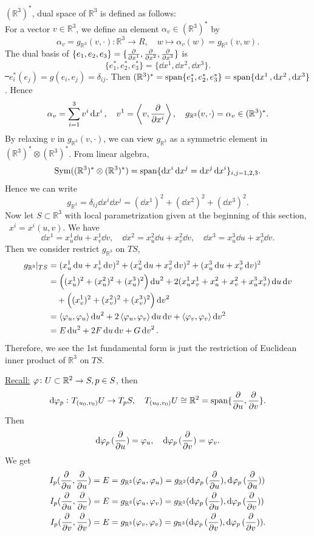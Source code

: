 \((\mathbb{R}^3)^*\), dual space of \(\mathbb{R}^3\) is defined as follows:\\
For a vector \(v\in \mathbb{R}^3\), we define an element \(\alpha_v\in(\mathbb{R}^3)
^*\) by \[
    \alpha_v=g_{\mathbb{R}^3}(v,\cdot)\colon \mathbb{R}^3\to R, \quad 
    w\mapsto \alpha_v(w)=g_{\mathbb{R}^3}(v,w)
.\] The dual basis of \(\{e_1,e_2,e_3\}=\{\pdv{x^1},\pdv{x^2},\pdv{x^3}\}\) is \[
    \{e_1^*,e_2^*,e_3^*\}=\{\dd{x^1},\dd{x^2},\dd{x^3}\}
.\] \st\ \(e_i^*(e_j)=g(e_i,e_j)=\delta_{ij}\). Then \((\mathbb{R}^3)^*=\operatorname{span}
\{e_1^*,e_2^*,e_3^*\}=\operatorname{span}\{\dd{x^1},\dd{x^2},\dd{x^3}\}\). Hence \[
    \alpha_v=\sum_{i=1}^3 v^i \dd{x^i},\quad
    v^1=\left<v,\pdv{x^i}\right> ,\quad
    g_{\mathbb{R}^3}(v,\cdot)=\alpha_v\in (\mathbb{R}^3)^*
.\] By relaxing \(v\) in \(g_{\mathbb{R}^3}(v,\cdot)\), we can view \(g_{\mathbb{R}
^3}\) as a symmetric element in \((\mathbb{R}^3)^*\otimes (\mathbb{R}^3)^*\).
From linear algebra, \[
    \mathrm{Sym}((\mathbb{R}^3)^*\otimes (\mathbb{R}^3)^*)=
    \operatorname{span}\{\dd{x^i}\dd{x^j}=\dd{x^j}\dd{x^i}\}_{i,j=1,2,3}
.\] Hence we can write \[
    g_{\mathbb{R}^3}=\delta_{ij}\dd{x^i}\dd{x^j}=
    (\dd{x^1})^2+(\dd{x^2})^2+(\dd{x^3})^2
.\] Now let \(S\subset \mathbb{R}^3\) with local parametrization given at the
beginning of this section, \ie\ \(x^i=x^i(u,v)\). We have \[
    \dd{x^1}=x_u^1\dd{u}+x_v^1\dd{v},\quad
    \dd{x^2}=x_u^2\dd{u}+x_v^2\dd{v},\quad
    \dd{x^3}=x_u^3\dd{u}+x_v^3\dd{v}
.\] Then we consider restrict \(g_{\mathbb{R}^3}\) on \(TS\),
\begin{align*}
    g_{\mathbb{R}^3}|_{TS}
    &=(x_u^1\dd{u}+x_v^1\dd{v})^2+(x_u^2\dd{u}+x_v^2\dd{v})^2
    +(x_u^3\dd{u}+x_v^3\dd{v})^2 \\
    &=\left((x_u^1)^2+(x_u^2)^2+(x_u^3)^2\right)\dd{u}^2
    +2(x_u^1x_v^1+x_u^2+x_v^2+x_u^3x_v^3)\dd{u}\dd{v} \\
    &\quad+\left((x_v^1)^2+(x_v^2)^2+(x_v^3)^2\right)\dd{v}^2 \\
    &=\left<\varphi_u,\varphi_u\right>\dd{u}^2+2\left<\varphi_u,\varphi_v\right>\dd{u}\dd{v}
    +\left<\varphi_v,\varphi_v\right>\dd{v^2} \\
    &=E\dd{u^2}+2F\dd{u}\dd{v}+G\dd{v}^2
.\end{align*}
Therefore, we see the 1st fundamental form is just the restriction of Euclidean
inner product of \(\mathbb{R}^3\) on \(TS\).

\underline{Recall:} \(\varphi\colon U\subset \mathbb{R}^2\to S,p\in S\), then \[
    \dd{\varphi_p}\colon T_{(u_0,v_0)}U\to T_p S,
    \quad T_{(u_0,v_0)}U\cong \mathbb{R}^2=\operatorname{span}\{\pdv{u},\pdv{v}\}.
\] Then \[
    \dd{\varphi_p}(\pdv{u})=\varphi_u,\quad \dd{\varphi_p}(\pdv{v})=\varphi_v
.\] We get
\begin{align*}
    I_p(\pdv{u},\pdv{u})&=E=g_{\mathbb{R}^3}(\varphi_u,\varphi_u)
    =g_{\mathbb{R}^3}(\dd{\varphi_p}(\pdv{u}),\dd{\varphi_p}(\pdv{u})) \\
    I_p(\pdv{u},\pdv{v})&=E=g_{\mathbb{R}^3}(\varphi_u,\varphi_v)
    =g_{\mathbb{R}^3}(\dd{\varphi_p}(\pdv{u}),\dd{\varphi_p}(\pdv{v})) \\
    I_p(\pdv{v},\pdv{v})&=E=g_{\mathbb{R}^3}(\varphi_v,\varphi_v)
    =g_{\mathbb{R}^3}(\dd{\varphi_p}(\pdv{v}),\dd{\varphi_p}(\pdv{v}))
.\end{align*}


